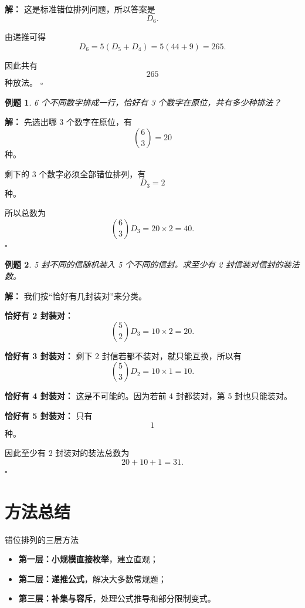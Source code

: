 \documentclass[11pt,a4paper,fontset=fandol]{ctexart}
\theoremstyle{formaltheorem}
\theoremstyle{formalexample}
\newtheorem{example}{例题}[section]
\newenvironment{solution}{\par\noindent\textbf{解：}}{\hfill$\square$\par}
\begin{document}
\begin{solution}
这是标准错位排列问题，所以答案是
\[
D_6.
\]

由递推可得
\[
D_6=5(D_5+D_4)=5(44+9)=265.
\]

因此共有
\[
265
\]
种放法。
\end{solution}

\begin{example}
6 个不同数字排成一行，恰好有 3 个数字在原位，共有多少种排法？
\end{example}

\begin{solution}
先选出哪 3 个数字在原位，有
\[
\binom{6}{3}=20
\]
种。

剩下的 3 个数字必须全部错位排列，有
\[
D_3=2
\]
种。

所以总数为
\[
\binom{6}{3}D_3=20\times 2=40.
\]
\end{solution}

\begin{example}
5 封不同的信随机装入 5 个不同的信封。求至少有 2 封信装对信封的装法数。
\end{example}

\begin{solution}
我们按“恰好有几封装对”来分类。

\textbf{恰好有 2 封装对：}
\[
\binom{5}{2}D_3=10\times 2=20.
\]

\textbf{恰好有 3 封装对：}
剩下 2 封信若都不装对，就只能互换，所以有
\[
\binom{5}{3}D_2=10\times 1=10.
\]

\textbf{恰好有 4 封装对：}
这是不可能的。因为若前 4 封都装对，第 5 封也只能装对。

\textbf{恰好有 5 封装对：}
只有
\[
1
\]
种。

因此至少有 2 封装对的装法总数为
\[
20+10+1=31.
\]
\end{solution}

\section{方法总结}

\begin{goalbox}{错位排列的三层方法}
\begin{itemize}
  \item \textbf{第一层：小规模直接枚举}，建立直观；
  \item \textbf{第二层：递推公式}，解决大多数常规题；
  \item \textbf{第三层：补集与容斥}，处理公式推导和部分限制变式。
\end{itemize}
\end{goalbox}
\end{document}
